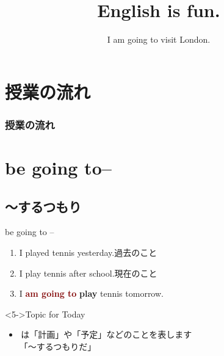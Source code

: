 \documentclass[aspectratio=169,xcolor={dvipsnames,table}]{beamer}
\title{English is fun.}
\subtitle{I am going to visit London.}
\author{}
\institute[]{}
\date[]
\newcommand{\myaudio}[1]{\href{#1}{\faVolumeUp}}
\begin{document}
\begin{frame}[plain]
  \titlepage
\end{frame}


\section*{授業の流れ}
\begin{frame}[plain]
  \frametitle{授業の流れ}
  \tableofcontents
\end{frame}



\section{be going to--}

\subsection{〜するつもり}
\begin{frame}[plain]{be going to --}
\Large
\begin{enumerate}
 \item<1-> I played tennis yesterday.\hfill{}{\small 過去のこと}
 \item<2-> I play tennis after school.\hfill{}{\small 現在のこと}
 \item<3-> I \textcolor{Maroon}{\bfseries am going to} {\bfseries play} tennis tomorrow.%
\hfill{}
\end{enumerate}

\vfill

\begin{exampleblock}<5->{Topic for Today}
\small
\begin{itemize}[square]
 \item {}\,は「計画」や「予定」などのことを表します\\
\hfill{}「～するつもりだ」
\end{itemize}
\end{exampleblock}
\hfill\myaudio{./audio/011_be_going_to_01.mp3}
\end{frame}
\end{document}
